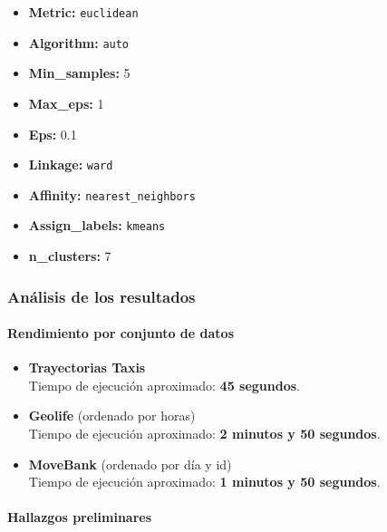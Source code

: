 \begin{itemize}
    \item \textbf{Metric:} \texttt{euclidean}
    \item \textbf{Algorithm:} \texttt{auto}
    \item \textbf{Min\_samples:} 5
    \item \textbf{Max\_eps:} 1
    \item \textbf{Eps:} 0.1
    \item \textbf{Linkage:} \texttt{ward}
    \item \textbf{Affinity:} \texttt{nearest\_neighbors}
    \item \textbf{Assign\_labels:} \texttt{kmeans}
    \item \textbf{n\_clusters:} 7
\end{itemize}

\subsubsection{Análisis de los resultados}

\paragraph{Rendimiento por conjunto de datos}

\begin{itemize}
    \item \textbf{Trayectorias Taxis} \cite{trayectorias_taxis}  \\
    Tiempo de ejecución aproximado: \textbf{45 segundos}.

    \item \textbf{Geolife} \cite{geolife_trajectories} (ordenado por horas)  \\
    Tiempo de ejecución aproximado: \textbf{2 minutos y 50 segundos}.

    \item \textbf{MoveBank} \cite{movebank} (ordenado por día y id)\\
    Tiempo de ejecución aproximado: \textbf{1 minutos y 50 segundos}.
\end{itemize}

\paragraph{Hallazgos preliminares}

